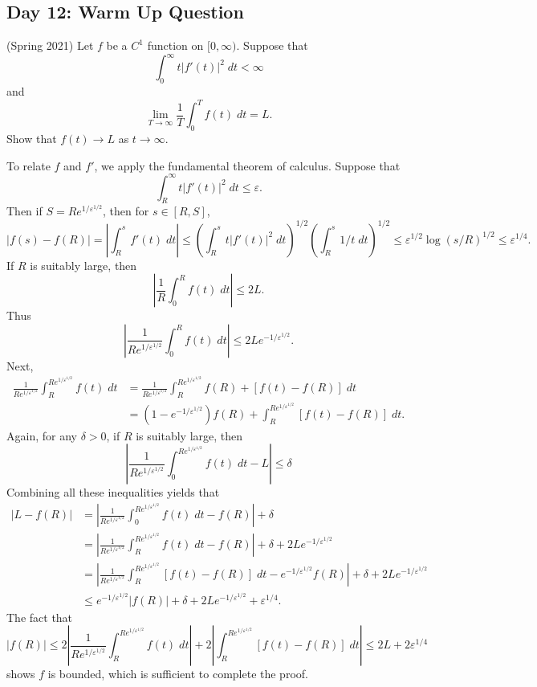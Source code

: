 \documentclass[answers]{exam}
\theoremstyle{problemstyle}
\newcommand{\1}[1]{\textbf{1}_{\left[#1\right]}} %
\begin{document}
\begin{questions}
\newpage
\section*{Day 12: Warm Up Question}

\question (Spring 2021) Let $f$ be a $C^1$ function on $[0,\infty)$. Suppose that
%
\[ \int_0^\infty t |f'(t)|^2\; dt < \infty \]
%
and
%
\[ \lim_{T \to \infty} \frac{1}{T} \int_0^T f(t)\; dt = L. \]
%
Show that $f(t) \to L$ as $t \to \infty$.
\begin{solution}
    To relate $f$ and $f'$, we apply the fundamental theorem of calculus. Suppose that
    \[ \int_R^\infty t |f'(t)|^2\; dt \leq \varepsilon. \]
    Then if $S = R e^{1/\varepsilon^{1/2}}$, then for $s \in [R,S]$,
    \[ |f(s) - f(R)| = \left| \int_R^s f'(t)\; dt \right| \leq \left( \int_R^s t |f'(t)|^2\; dt \right)^{1/2} \left( \int_R^s 1/t\; dt \right)^{1/2} \leq \varepsilon^{1/2} \log(s/R)^{1/2} \leq \varepsilon^{1/4}. \]
    If $R$ is suitably large, then
    \[ \left| \frac{1}{R} \int_0^R f(t)\; dt \right| \leq 2L. \]
    Thus
    \[ \left| \frac{1}{R e^{1/\varepsilon^{1/2}}} \int_0^R f(t)\; dt \right| \leq 2L e^{-1/\varepsilon^{1/2}}. \]
    Next,
    \begin{align*}
        \frac{1}{R e^{1/\varepsilon^{1/2}}} \int_R^{Re^{1/\varepsilon^{1/2}}} f(t)\; dt &= \frac{1}{R e^{1/\varepsilon^{1/2}}} \int_R^{Re^{1/\varepsilon^{1/2}}} f(R) + [f(t) - f(R)]\; dt\\
        &= \left( 1 - e^{-1/\varepsilon^{1/2}} \right) f(R) + \int_R^{R e^{1/\varepsilon^{1/2}}} [f(t) - f(R)]\; dt.
    \end{align*}
    Again, for any $\delta > 0$, if $R$ is suitably large, then
    \[ \left| \frac{1}{R e^{1/\varepsilon^{1/2}}} \int_0^{R e^{1/\varepsilon^{1/2}}} f(t)\; dt - L \right| \leq \delta \]
    Combining all these inequalities yields that
    \begin{align*}
        |L - f(R)| &= \left| \frac{1}{R e^{1/\varepsilon^{1/2}}} \int_0^{R e^{1/\varepsilon^{1/2}}} f(t)\; dt - f(R) \right| + \delta\\
        &= \left| \frac{1}{R e^{1/\varepsilon^{1/2}}} \int_R^{R e^{1/\varepsilon^{1/2}}} f(t)\; dt - f(R) \right| + \delta + 2Le^{-1/\varepsilon^{1/2}}\\
        &= \left| \frac{1}{R e^{1/\varepsilon^{1/2}}} \int_R^{R e^{1/\varepsilon^{1/2}}} [f(t) - f(R)]\; dt - e^{-1/\varepsilon^{1/2}} f(R) \right| + \delta + 2Le^{-1/\varepsilon^{1/2}}\\
        &\leq e^{-1/\varepsilon^{1/2}} |f(R)| + \delta + 2L e^{-1/\varepsilon^{1/2}} + \varepsilon^{1/4}.
    \end{align*}
    The fact that
    \[ |f(R)| \leq 2 \left| \frac{1}{R e^{1/\varepsilon^{1/2}}} \int_R^{Re^{1/\varepsilon^{1/2}}} f(t)\; dt \right| + 2 \left| \int_R^{R e^{1/\varepsilon^{1/2}}} [f(t) - f(R)]\; dt \right| \leq 2L + 2 \varepsilon^{1/4} \]
    shows $f$ is bounded, which is sufficient to complete the proof.
\end{solution}



\end{questions}
\end{document}
